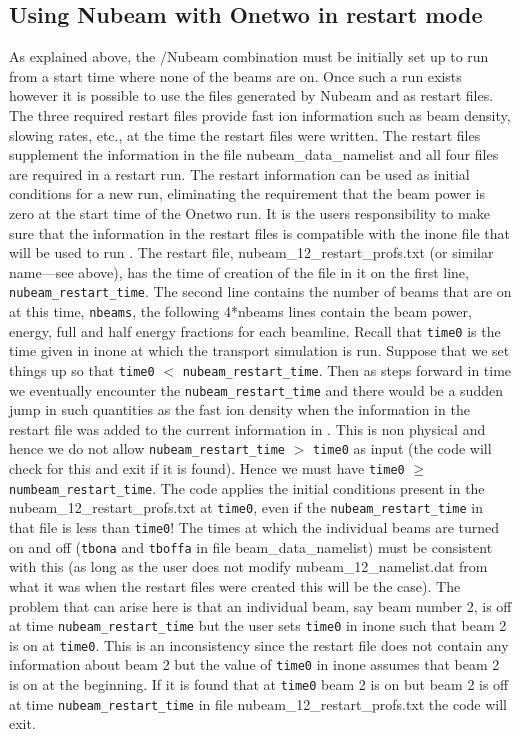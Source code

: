    \subsection{Using Nubeam with Onetwo in restart mode}
   As explained above, the \ot/Nubeam combination must be 
   initially set up to run
   from a start time where none of the beams are  on. Once such a run
   exists however it is possible to use the files generated 
   by Nubeam and \ot as restart files.
    The three required restart files provide
   fast ion information such as beam density, slowing rates, etc., at
   the time the restart files were  written. The restart files supplement
   the information in the file nubeam\_data\_namelist and all four files
   are required in a restart run.
    The restart information can be used
   as initial conditions for a new run, eliminating the requirement
   that the beam power is zero at the start time of the Onetwo run.
   It is the users responsibility to make sure that the information in
   the restart files is compatible with the inone file that will be
   used to run \ot. The restart file, nubeam\_12\_restart\_profs.txt
   (or similar name---see above), has the time  of creation of the
   file in it on the first line, \texttt{nubeam\_restart\_time}. The second line contains the number
   of beams that are on at this time, \texttt{nbeams}, the following 4*nbeams
   lines contain the beam power, energy, full and half energy
   fractions for each beamline. Recall that \texttt{time0} is the time given in
   inone at which the transport simulation is run. Suppose that we set
   things up so that \texttt{time0} $<$ \texttt{nubeam\_restart\_time}. Then as \ot
   steps forward in time we  eventually encounter the
   \texttt{nubeam\_restart\_time} and there  would be a sudden jump in such
   quantities as the fast ion density when the information in the
   restart file was added to the current information in \ot.
   This is non physical and hence we do not allow 
   \texttt{nubeam\_restart\_time} $>$ \texttt{time0} as input (the code will check for this
   and exit if it is found). Hence we must have \texttt{time0} $\ge $
   \texttt{numbeam\_restart\_time}. 
   The code applies the initial conditions present in the  
   nubeam\_12\_restart\_profs.txt at \texttt{time0}, even if the
   \texttt{nubeam\_restart\_time} in that file is less than \texttt{time0}!
   The times at which the individual beams are turned on and off
   (\texttt{tbona} and \texttt{tboffa} in file beam\_data\_namelist) must be
   consistent with this (as long as the user does not modify
    nubeam\_12\_namelist.dat from what it was when the restart files
    were created this will be the case). The problem that can arise
    here is that an individual beam, say beam number 2, is off at
    time \texttt{nubeam\_restart\_time} but the user sets \texttt{time0} in inone such
    that beam 2 is on at \texttt{time0}.  This is an inconsistency  since the
    restart file does not contain any information about beam 2 but the
    value of \texttt{time0} in inone assumes that beam 2 is on at the beginning.
    If it is found that at \texttt{time0} beam 2 is on but beam 2 is off
    at time  \texttt{nubeam\_restart\_time} in file nubeam\_12\_restart\_profs.txt
    the code will exit.

